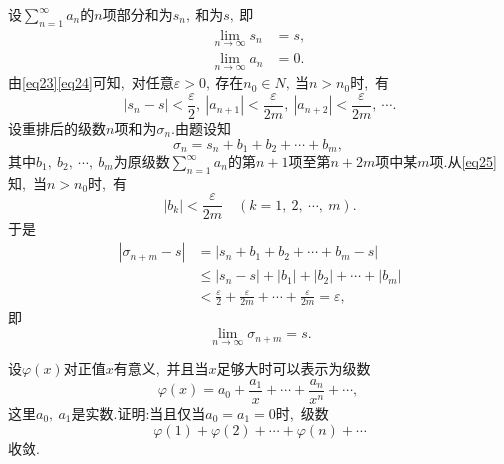 	\begin{solution}
		设$\sum\limits_{n=1}^{\infty}a_n$的$n$项部分和为$s_n,\ $和为$s,\ $即
		\begin{align}
			\lim\limits_{n\rightarrow\infty}s_n&=s,\ \label{eq23}\\
			\lim\limits_{n\rightarrow\infty}a_n&=0.\label{eq24}
		\end{align}
		由\eqref{eq23}\eqref{eq24}可知,\ 对任意$\varepsilon>0,\ $存在$n_0\in N,\ $当$n>n_0$时,\ 有
		\begin{equation}
			|s_n-s|<\frac{\varepsilon}{2},\ |a_{n+1}|<\frac{\varepsilon}{2m},\ |a_{n+2}|<\frac{\varepsilon}{2m},\ \cdots.\label{eq25}
		\end{equation}
		设重排后的级数$n$项和为$\sigma _n.$由题设知
		$$\sigma_n=s_n+b_1+b_2+\cdots+b_m,\ $$
		其中$b_1,\ b_2,\ \cdots,\ b_m$为原级数$\sum\limits_{n=1}^{\infty}a_n$的第$n+1$项至第$n+2m$项中某$m$项.从\eqref{eq25}知,\ 当$n>n_0$时,\ 有
		$$|b_k|<\frac{\varepsilon}{2m}\quad(k=1,\ 2,\ \cdots,\ m).$$
		于是
		\begin{align*}
			|\sigma_{n+m}-s|&=|s_n+b_1+b_2+\cdots+b_m-s|\\
			&\le|s_n-s|+|b_1|+|b_2|+\cdots+|b_m|\\
			&<\frac{\varepsilon}{2}+\frac{\varepsilon}{2m}+\cdots+\frac{\varepsilon}{2m}=\varepsilon,\ 
		\end{align*}
		即
		$$\lim\limits_{n\rightarrow\infty}\sigma_{n+m}=s.$$ 
	\end{solution}
	\newpage
	\begin{problem}
		设$\varphi(x)$对正值$x$有意义,\ 并且当$x$足够大时可以表示为级数
		$$\varphi(x)=a_0+\frac{a_1}{x}+\cdots+\frac{a_n}{x^n}+\cdots,\ $$
		这里$a_0,\ a_1$是实数.证明:当且仅当$a_0=a_1=0$时,\ 级数
		$$\varphi(1)+\varphi(2)+\cdots+\varphi(n)+\cdots$$收敛.
	\end{problem}
	
